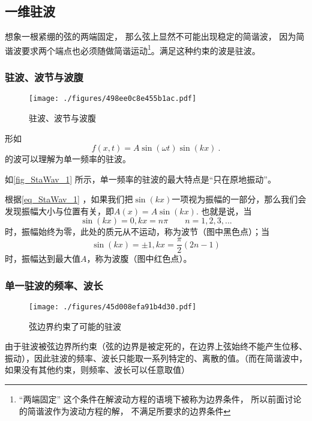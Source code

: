 
\begin{issues}
\issueDraft
\end{issues}


\subsection{一维驻波}
想象一根紧绷的弦的两端固定， 那么弦上显然不可能出现稳定的简谐波， 因为简谐波要求两个端点也必须随做简谐运动\footnote{“两端固定” 这个条件在解波动方程的语境下被称为边界条件， 所以前面讨论的简谐波作为波动方程的解， 不满足所要求的边界条件}。满足这种约束的波是驻波。

\subsubsection{驻波、波节与波腹}
\begin{figure}[ht]
\centering
\texttt{[image: ./figures/498ee0c8e455b1ac.pdf]}
\caption{驻波、波节与波腹} \label{fig_StaWav_1}
\end{figure}

形如
\begin{equation}\label{eq_StaWav_1}
f(x,t)=A\sin(\omega t)\sin(kx)~.
\end{equation}
的波可以理解为单一频率的驻波。

如\autoref{fig_StaWav_1} 所示，单一频率的驻波的最大特点是“只在原地振动”。

根据\autoref{eq_StaWav_1} ，如果我们把$\sin(kx)$一项视为振幅的一部分，那么我们会发现振幅大小与位置有关，即$A(x) = A \sin(kx)$. 也就是说，当$$\sin(kx)=0, kx=n\pi \qquad n=1,2,3,...$$时，振幅始终为零，此处的质元从不运动，称为波节（图中黑色点）；当$$\sin(kx)=\pm1, kx=\frac{\pi}{2} (2n-1)$$时，振幅达到最大值$A$，称为波腹（图中红色点）。

\subsubsection{单一驻波的频率、波长}
\begin{figure}[ht]
\centering
\texttt{[image: ./figures/45d008efa91b4d30.pdf]}
\caption{弦边界约束了可能的驻波} \label{fig_StaWav_2}
\end{figure}

由于驻波被弦边界所约束（弦的边界是被定死的，在边界上弦始终不能产生位移、振动），因此驻波的频率、波长只能取一系列特定的、离散的值。（而在简谐波中，如果没有其他约束，则频率、波长可以任意取值）

